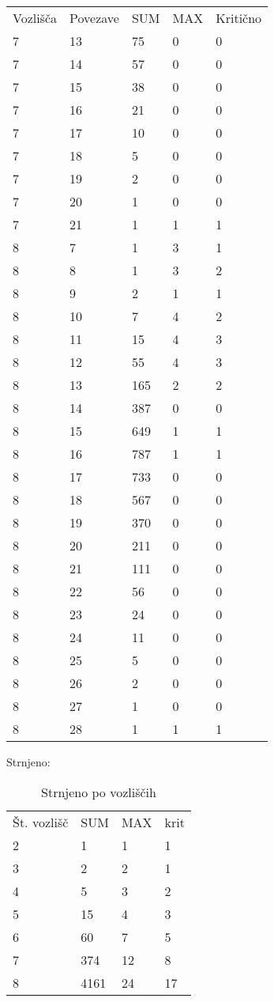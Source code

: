 \documentclass[fin1, tisk]{fmfdelo}
\begin{document}
\begin{tabular}{lllll}
    Vozlišča & Povezave & SUM & MAX & Kritično \\ 
    7 & 13 & 75 & 0 & 0 \\ 
    7 & 14 & 57 & 0 & 0 \\ 
    7 & 15 & 38 & 0 & 0 \\ 
    7 & 16 & 21 & 0 & 0 \\ 
    7 & 17 & 10 & 0 & 0 \\ 
    7 & 18 & 5 & 0 & 0 \\ 
    7 & 19 & 2 & 0 & 0 \\ 
    7 & 20 & 1 & 0 & 0 \\ 
    7 & 21 & 1 & 1 & 1 \\ 
    8 & 7 & 1 & 3 & 1 \\ 
    8 & 8 & 1 & 3 & 2 \\ 
    8 & 9 & 2 & 1 & 1 \\ 
    8 & 10 & 7 & 4 & 2 \\ 
    8 & 11 & 15 & 4 & 3 \\ 
    8 & 12 & 55 & 4 & 3 \\ 
    8 & 13 & 165 & 2 & 2 \\ 
    8 & 14 & 387 & 0 & 0 \\ 
    8 & 15 & 649 & 1 & 1 \\ 
    8 & 16 & 787 & 1 & 1 \\ 
    8 & 17 & 733 & 0 & 0 \\ 
    8 & 18 & 567 & 0 & 0 \\ 
    8 & 19 & 370 & 0 & 0 \\ 
    8 & 20 & 211 & 0 & 0 \\ 
    8 & 21 & 111 & 0 & 0 \\ 
    8 & 22 & 56 & 0 & 0 \\ 
    8 & 23 & 24 & 0 & 0 \\ 
    8 & 24 & 11 & 0 & 0 \\ 
    8 & 25 & 5 & 0 & 0 \\ 
    8 & 26 & 2 & 0 & 0 \\ 
    8 & 27 & 1 & 0 & 0 \\ 
    8 & 28 & 1 & 1 & 1 \\ 
\end{tabular}





Strnjeno:

\begin{table}[]
\begin{tabular}{llll}
Št. vozlišč & SUM  & MAX & krit\\
2           & 1    & 1   & 1   \\
3           & 2    & 2   & 1   \\
4           & 5    & 3   & 2   \\
5           & 15   & 4   & 3   \\
6           & 60   & 7   & 5   \\
7           & 374  & 12  & 8   \\
8           & 4161 & 24  & 17 
\end{tabular}
\caption{Strnjeno po vozliščih}
\end{table}
\end{document}
